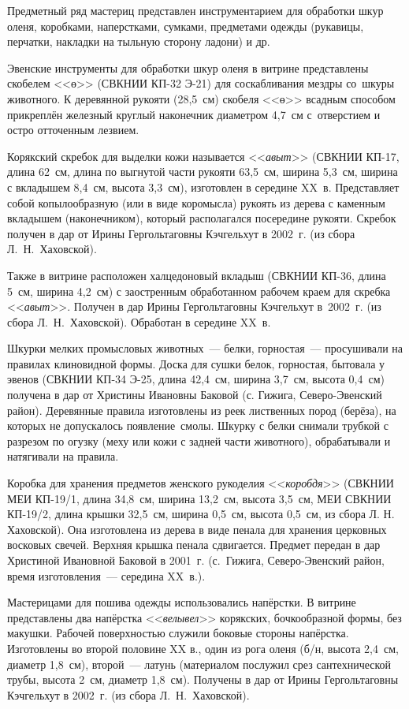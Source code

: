 Предметный ряд мастериц представлен инструментарием для обработки шкур оленя, коробками, наперстками, сумками, предметами одежды (рукавицы, перчатки, накладки на тыльную сторону ладони) и др.

Эвенские инструменты для обработки шкур оленя в витрине представлены скобелем <<ө>> (СВКНИИ КП-32 Э-21) для соскабливания мездры со~шкуры животного. К деревянной рукояти (28,5~см) скобеля <<ө>> всадным способом прикреплён железный круглый наконечник диаметром 4,7~см с~отверстием и остро отточенным лезвием.

Корякский скребок для выделки кожи называется <<\textit{авыт}>> (СВКНИИ КП-17, длина 62~см, длина по выгнутой части рукояти 63,5~см, ширина 5,3~см, ширина с вкладышем 8,4~см, высота 3,3~см), изготовлен в середине XX~в. Представляет собой копылообразную (или в виде коромысла) рукоять из дерева с каменным вкладышем (наконечником), который располагался посередине рукояти. Скребок получен в дар от Ирины Гергольтаговны Кэчгельхут в 2002~г. (из сбора Л.~Н.~Хаховской).

Также в витрине расположен халцедоновый вкладыш (СВКНИИ КП-36, длина 5~см, ширина 4,2~см) с заостренным обработанном рабочем краем для скребка <<\textit{авыт}>>. Получен в дар Ирины Гергольтаговны Кэчгельхут в~2002~г. (из сбора Л.~Н.~Хаховской). Обработан в середине XX~в.

Шкурки мелких промысловых животных~--- белки, горностая~--- просушивали на правилах клиновидной формы. Доска для сушки белок, горностая, бытовала у эвенов (СВКНИИ КП-34 Э-25, длина 42,4~см, ширина 3,7~см, высота 0,4~см) получена в дар от Христины Ивановны Баковой (с. Гижига, Северо-Эвенский район). Деревянные правила изготовлены из реек лиственных пород (берёза), на которых не допускалось появление~смолы. Шкурку с белки снимали трубкой с разрезом по огузку (меху или кожи с задней части животного), обрабатывали и натягивали на правила.

Коробка для хранения предметов женского рукоделия <<\textit{коробдя}>> (СВКНИИ МЕИ КП-19/1, длина 34,8~см, ширина 13,2~см, высота 3,5~см, МЕИ СВКНИИ КП-19/2, длина крышки 32,5~см, ширина 0,5~см, высота 0,5~см, из сбора Л. Н. Хаховской). Она изготовлена из дерева в виде пенала для хранения церковных восковых свечей. Верхняя крышка пенала сдвигается. Предмет передан в дар Христиной Ивановной Баковой в 2001~г. (с.~Гижига, Северо-Эвенский район, время изготовления~--- середина XX~в.).

Мастерицами для пошива одежды использовались напёрстки. В витрине представлены два напёрстка <<\textit{велывел}>> корякских, бочкообразной формы, без макушки. Рабочей поверхностью служили боковые стороны напёрстка. Изготовлены во второй половине XX в., один из рога оленя (б/н, высота 2,4~см, диаметр 1,8~см), второй~--- латунь (материалом послужил срез сантехнической трубы, высота 2~см, диаметр 1,8~см). Получены в дар от Ирины Гергольтаговны Кэчгельхут в 2002~г. (из сбора Л.~Н.~Хаховской).

